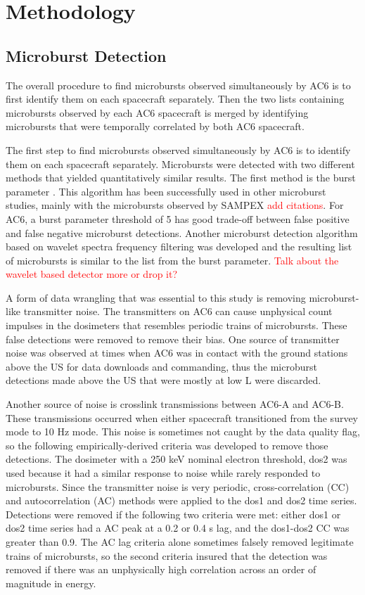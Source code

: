 \documentclass[draft]{agujournal2019}
\begin{document}
\section{Methodology}
\subsection{Microburst Detection}
The overall procedure to find microbursts observed simultaneously by AC6 is to first identify them on each spacecraft separately. Then the two lists containing microbursts observed by each AC6 spacecraft is merged by identifying microbursts that were temporally correlated by both AC6 spacecraft.

The first step to find microbursts observed simultaneously by AC6 is to identify them on each spacecraft separately. Microbursts were detected with two different methods that yielded quantitatively similar results. The first method is the burst parameter \cite{O'Brien2003}. This algorithm has been successfully used in other microburst studies, mainly with the microbursts observed by SAMPEX \textcolor{red}{add citations}. For AC6, a burst parameter threshold of 5 has good trade-off between false positive and false negative microburst detections. Another microburst detection algorithm based on wavelet spectra frequency filtering was developed and the resulting list of microbursts is similar to the list from the burst parameter. \textcolor{red}{Talk about the wavelet based detector more or drop it?}

A form of data wrangling that was essential to this study is removing microburst-like transmitter noise. The transmitters on AC6 can cause unphysical count impulses in the dosimeters that resembles periodic trains of microbursts. These false detections were removed to remove their bias. One source of transmitter noise was observed at times when AC6 was in contact with the ground stations above the US for data downloads and commanding, thus the microburst detections made above the US that were mostly at low L were discarded. 

Another source of noise is crosslink transmissions between AC6-A and AC6-B. These transmissions occurred when either spacecraft transitioned from the survey mode to 10 Hz mode. This noise is sometimes not caught by the data quality flag, so the following empirically-derived criteria was developed to remove those detections. The dosimeter with a 250 keV nominal electron threshold, dos2 was used because it had a similar response to noise while rarely responded to microbursts. Since the transmitter noise is very periodic, cross-correlation (CC) and autocorrelation (AC) methods were applied to the dos1 and dos2 time series. Detections were removed if the following two criteria were met: either dos1 or dos2 time series had a AC peak at a 0.2 or 0.4 s lag, and the dos1-dos2 CC was greater than 0.9. The AC lag criteria alone sometimes falsely removed legitimate trains of microbursts, so the second criteria insured that the detection was removed if there was an unphysically high correlation across an order of magnitude in energy.
\end{document}
